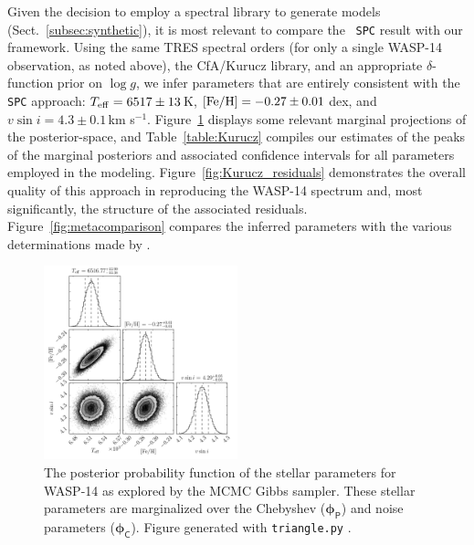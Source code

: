 \documentclass[iop,floatfix]{emulateapj}
\newcommand{\vp}{ {\bm \phi}}
\newcommand{\cheb}{ \vp_{\mathsf{P}}}
\newcommand{\cov}{ \vp_{\mathsf{C}}}
\begin{document}
Given the decision to employ a spectral library to generate models
(Sect.~\ref{subsec:synthetic}), it is most relevant to compare the
\citeauthor{torres12}~{\tt SPC} result with our framework.  Using the same TRES
spectral orders (for only a single WASP-14 observation, as noted above), the
{\sc CfA/Kurucz} library, and an appropriate $\delta$-function prior on $\log
g$, we infer parameters that are entirely consistent with the {\tt SPC}
approach: $T_{\rm eff} = 6517\pm13$\,K, $[{\rm Fe/H}] = -0.27\pm0.01$\,dex, and
$v \sin i = 4.3\pm0.1$\,km s$^{-1}$.  Figure~\ref{fig:Kurucz_posterior}
displays some relevant marginal projections of the posterior-space, and
Table~\ref{table:Kurucz} compiles our estimates of the peaks of the marginal
posteriors and associated confidence intervals for all parameters employed in
the modeling.  Figure~\ref{fig:Kurucz_residuals} demonstrates the overall
quality of this approach in reproducing the WASP-14 spectrum and, most
significantly, the structure of the associated residuals.
Figure~\ref{fig:metacomparison} compares the inferred parameters with the
various determinations made by \citet{torres12}.  

\begin{figure}[!htb]
\begin{center}
  \includegraphics[width=0.5\textwidth]{figs/Kurucz_triangle.pdf}
  \caption{The posterior probability function of the stellar parameters for WASP-14 as explored by the MCMC Gibbs sampler. These stellar parameters are marginalized over the Chebyshev ($\cheb$) and noise parameters ($\cov$). Figure generated with \texttt{triangle.py} \citep{foreman-mackey14}.
}
\label{fig:Kurucz_posterior}
\end{center}
\end{figure}
\end{document}
